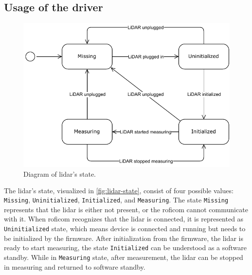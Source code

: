 \documentclass[
  digital,     %
  oneside,     %
  nosansbold,  %
  nocolorbold, %
  nolof,         %
  nolot,         %
]{fithesis4}
\begin{document}
{{{\subsection{ Usage of the driver }

\begin{figure}[h!]
    \includegraphics[width=\textwidth,height=\textheight,keepaspectratio]{assets/lidar-state.pdf}
    \caption[Diagram of \acrshort{lidar}'s state]{Diagram of \acrshort{lidar}'s state.}
    \label{fig:lidar-state}
\end{figure}

The \acrshort{lidar}'s state, visualized in \autoref{fig:lidar-state}, consist of four possible values: \texttt{Missing}, \texttt{Uninitialized}, \texttt{Initialized}, and \texttt{Measuring}. The state \texttt{Missing} represents that the \acrshort{lidar} is either not present, or the \acrshort{roficom} cannot communicate with it. When \acrshort{roficom} recognizes that the \acrshort{lidar} is connected, it is represented as \texttt{Uninitialized} state, which means device is connected and running but needs to be initialized by the firmware. After initialization from the firmware, the \acrshort{lidar} is ready to start measuring, the state \texttt{Initialized} can be understood as a software standby. While in \texttt{Measuring} state, after measurement, the \acrshort{lidar} can be stopped in measuring and returned to software standby.

}}}
\end{document}
